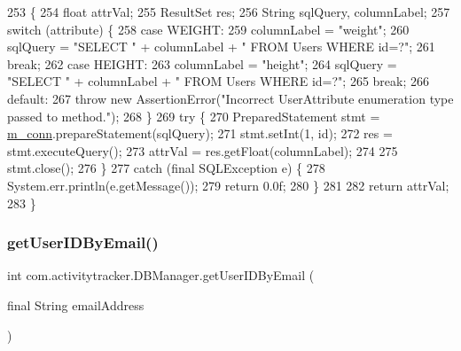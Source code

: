 \begin{DoxyCode}
253                                                                                     \{
254         \textcolor{keywordtype}{float} attrVal;
255         ResultSet res;
256         String sqlQuery, columnLabel;
257         \textcolor{keywordflow}{switch} (attribute) \{
258             \textcolor{keywordflow}{case} WEIGHT:
259                 columnLabel = \textcolor{stringliteral}{"weight"};
260                 sqlQuery = \textcolor{stringliteral}{"SELECT "} + columnLabel + \textcolor{stringliteral}{" FROM Users WHERE id=?"};
261                 \textcolor{keywordflow}{break};
262             \textcolor{keywordflow}{case} HEIGHT:
263                 columnLabel = \textcolor{stringliteral}{"height"};
264                 sqlQuery = \textcolor{stringliteral}{"SELECT "} + columnLabel + \textcolor{stringliteral}{" FROM Users WHERE id=?"};
265                 \textcolor{keywordflow}{break};
266             \textcolor{keywordflow}{default}:
267                 \textcolor{keywordflow}{throw} \textcolor{keyword}{new} AssertionError(\textcolor{stringliteral}{"Incorrect UserAttribute enumeration type passed to method."});
268         \}
269         \textcolor{keywordflow}{try} \{
270             PreparedStatement stmt = \mbox{\hyperlink{classcom_1_1activitytracker_1_1_d_b_manager_a064088d13ac09eb147fdc19268771521}{m\_conn}}.prepareStatement(sqlQuery);
271             stmt.setInt(1, \textcolor{keywordtype}{id});
272             res = stmt.executeQuery();
273             attrVal = res.getFloat(columnLabel);
274 
275             stmt.close();
276         \}
277         \textcolor{keywordflow}{catch} (\textcolor{keyword}{final} SQLException e) \{
278             System.err.println(e.getMessage());
279             \textcolor{keywordflow}{return} 0.0f;
280         \}
281 
282         \textcolor{keywordflow}{return} attrVal;
283     \}
\end{DoxyCode}
\mbox{\label{classcom_1_1activitytracker_1_1_d_b_manager_a195dcdeabdd00facb19d720976dd3f53}} 
\subsubsection{\texorpdfstring{get\+User\+I\+D\+By\+Email()}{getUserIDByEmail()}}
{\footnotesize\ttfamily int com.\+activitytracker.\+D\+B\+Manager.\+get\+User\+I\+D\+By\+Email (\begin{DoxyParamCaption}\item[{final String}]{email\+Address }\end{DoxyParamCaption})}

